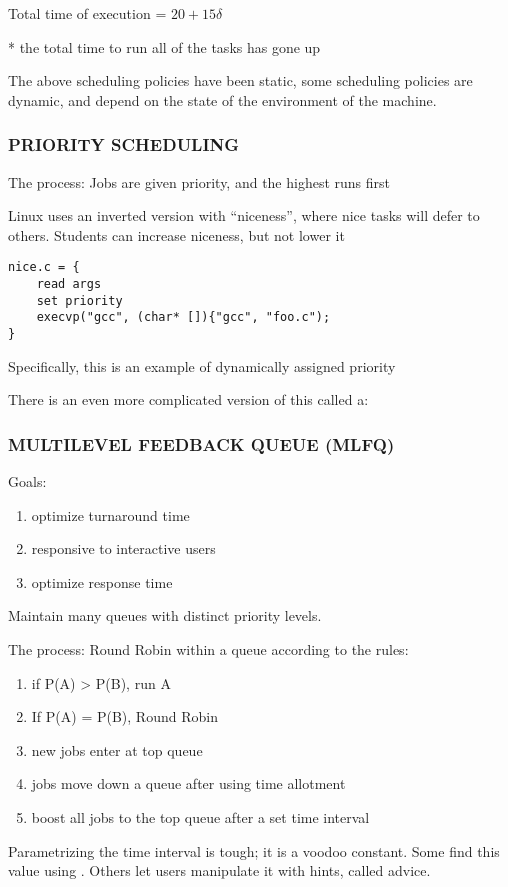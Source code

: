 \documentclass[../../lecture_notes.tex]{subfiles}
\begin{document}
Total time of execution = $20 + 15\delta$

*  the total time to run all of the tasks has gone up

The above scheduling policies have been static, some scheduling policies are dynamic, and depend on the state of the environment of the machine.


\subsubsection*{PRIORITY SCHEDULING}
The process: Jobs are given priority, and the highest runs first

Linux uses an inverted version with “niceness”, where nice tasks will defer to others. Students can increase niceness, but not lower it
\begin{lstlisting}
nice.c = {
	read args
	set priority
	execvp("gcc", (char* []){"gcc", "foo.c");
}
\end{lstlisting}

Specifically, this is an example of dynamically assigned priority

There is an even more complicated version of this called a:
\subsubsection*{MULTILEVEL FEEDBACK QUEUE (MLFQ)}
Goals:
	\begin{enumerate}[nosep]
	\item optimize turnaround time
	\item responsive to interactive users
	\item optimize response time
	\end{enumerate}
Maintain many queues with distinct priority levels.

The process: Round Robin within a queue according to the rules:
\begin{enumerate}[label=(\roman*), nosep]
	\item if P(A) > P(B), run A
	\item If P(A) = P(B), Round Robin
	\item new jobs enter at top queue
	\item jobs move down a queue after using time allotment
	\item boost all jobs to the top queue after a set time interval
\end{enumerate}

Parametrizing the time interval is tough; it is a voodoo constant. Some find this value using . Others let users manipulate it with hints, called advice.
\end{document}
